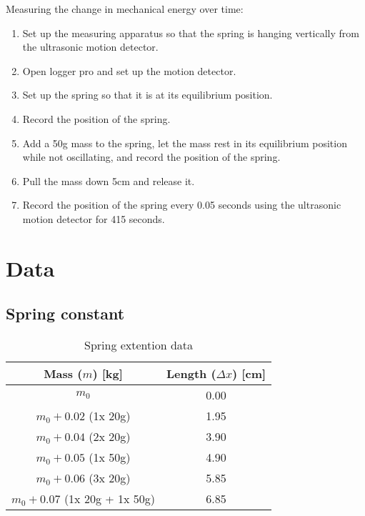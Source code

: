 \documentclass{article}
\begin{document}
        \noindent Measuring the change in mechanical energy over time:
        \begin{enumerate}
            \item Set up the measuring apparatus so that the spring is hanging vertically from the ultrasonic motion detector.
            \item Open logger pro and set up the motion detector.
            \item Set up the spring so that it is at its equilibrium position.
            \item Record the position of the spring.
            \item Add a 50g mass to the spring, let the mass rest in its equilibrium position while not oscillating, and record the position of the spring.
            \item Pull the mass down 5cm and release it.
            \item Record the position of the spring every 0.05 seconds using the ultrasonic motion detector for 415 seconds.
        \end{enumerate}
    
    
    \section{Data}
        
        \subsection{Spring constant}\label{subsec:spring-constant-data}
            \begin{table}[H]
                \centering
                \begin{tabular}{|c|c|}
                    \hline
                    Mass ($m$) [kg]                & Length ($\Delta x$) [cm] \\
                    \hline
                    $m_0$                          & 0.00                     \\
                    \hline
                    $m_0 + 0.02$ (1x 20g)          & 1.95                     \\
                    \hline
                    $m_0 + 0.04$ (2x 20g)          & 3.90                     \\
                    \hline
                    $m_0 + 0.05$ (1x 50g)          & 4.90                     \\
                    \hline
                    $m_0 + 0.06$ (3x 20g)          & 5.85                     \\
                    \hline
                    $m_0 + 0.07$ (1x 20g + 1x 50g) & 6.85                     \\
                    \hline
                \end{tabular}
                \caption{Spring extention data}\label{tab:spring-extention-data}
            \end{table}
        
\end{document}
